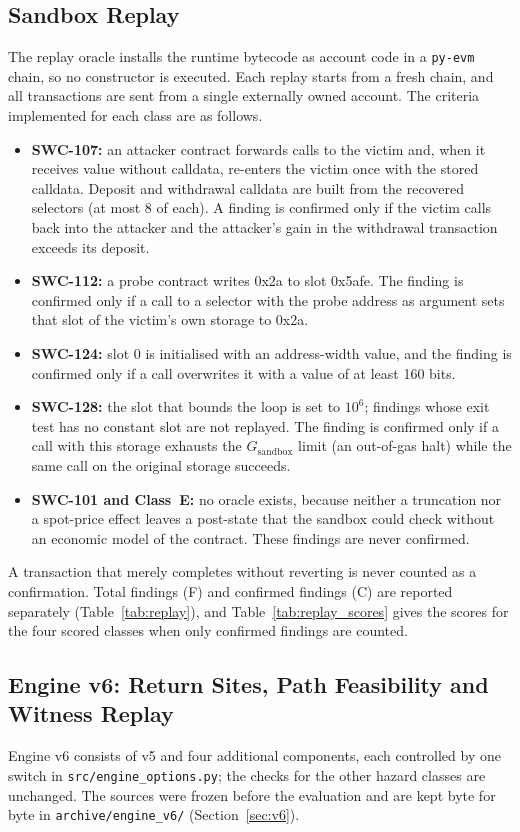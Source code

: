 \documentclass[pdflatex,sn-mathphys]{sn-jnl}
\theoremstyle{thmstyletwo}
\theoremstyle{thmstyletwo}
\begin{document}
\subsection{Sandbox Replay}\label{sec:arch:oracle}
The replay oracle installs the runtime bytecode as account code in a \texttt{py-evm} chain, so no constructor is executed. Each replay starts from a fresh chain, and all transactions are sent from a single externally owned account. The criteria implemented for each class are as follows.
\begin{itemize}
    \item \textbf{SWC-107:} an attacker contract forwards calls to the victim and, when it receives value without calldata, re-enters the victim once with the stored calldata. Deposit and withdrawal calldata are built from the recovered selectors (at most 8 of each). A finding is confirmed only if the victim calls back into the attacker and the attacker's gain in the withdrawal transaction exceeds its deposit.
    \item \textbf{SWC-112:} a probe contract writes 0x2a to slot 0x5afe. The finding is confirmed only if a call to a selector with the probe address as argument sets that slot of the victim's own storage to 0x2a.
    \item \textbf{SWC-124:} slot 0 is initialised with an address-width value, and the finding is confirmed only if a call overwrites it with a value of at least 160 bits.
    \item \textbf{SWC-128:} the slot that bounds the loop is set to $10^6$; findings whose exit test has no constant slot are not replayed. The finding is confirmed only if a call with this storage exhausts the $G_{\mathrm{sandbox}}$ limit (an out-of-gas halt) while the same call on the original storage succeeds.
    \item \textbf{SWC-101 and Class~E:} no oracle exists, because neither a truncation nor a spot-price effect leaves a post-state that the sandbox could check without an economic model of the contract. These findings are never confirmed.
\end{itemize}
A transaction that merely completes without reverting is never counted as a confirmation. Total findings (F) and confirmed findings (C) are reported separately (Table~\ref{tab:replay}), and Table~\ref{tab:replay_scores} gives the scores for the four scored classes when only confirmed findings are counted.

\subsection{Engine v6: Return Sites, Path Feasibility and Witness Replay}\label{sec:arch:v6}
Engine v6 consists of v5 and four additional components, each controlled by one switch in \texttt{src/engine\_options.py}; the checks for the other hazard classes are unchanged. The sources were frozen before the evaluation and are kept byte for byte in \texttt{archive/engine\_v6/} (Section~\ref{sec:v6}).
\end{document}
